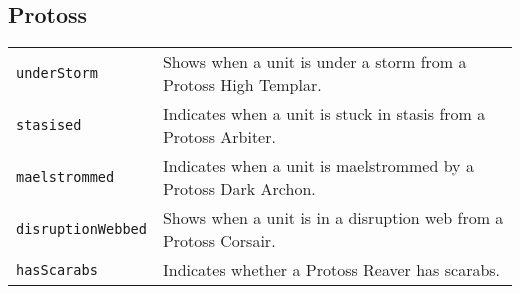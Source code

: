 \subsection{Protoss}
\begin{tabularx}{\textwidth}{lX}
 \verb|underStorm| & Shows when a unit is under a storm from a Protoss High Templar. \\
 \verb|stasised| & Indicates when a unit is stuck in stasis from a Protoss Arbiter. \\
 \verb|maelstrommed| & Indicates when a unit is maelstrommed by a Protoss Dark Archon. \\
 \verb|disruptionWebbed| & Shows when a unit is in a disruption web from a Protoss Corsair. \\
 \verb|hasScarabs| & Indicates whether a Protoss Reaver has scarabs.
\end{tabularx}